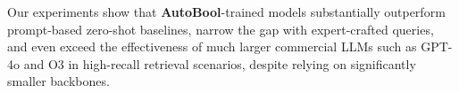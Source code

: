 Our experiments show that \textbf{AutoBool}-trained models substantially outperform prompt-based zero-shot baselines, narrow the gap with expert-crafted queries, and even exceed the effectiveness of much larger commercial LLMs such as GPT-4o and O3 in high-recall retrieval scenarios, despite relying on significantly smaller backbones.
